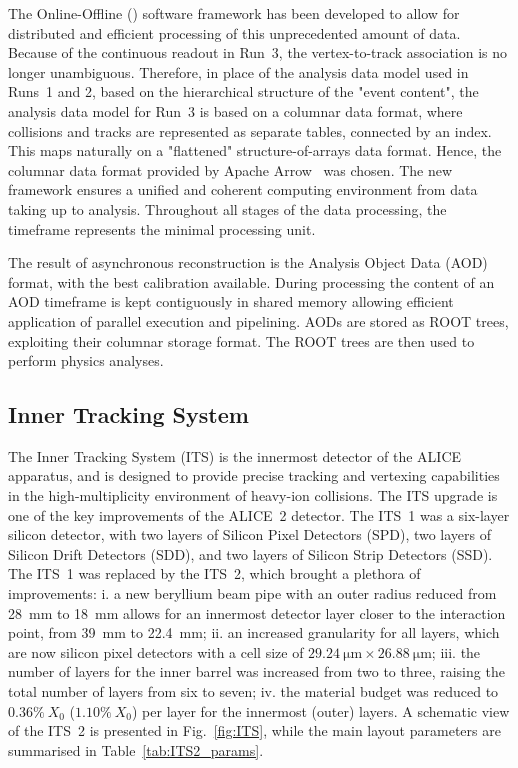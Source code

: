 The Online-Offline (\osq) software framework has been developed to allow for distributed and efficient processing of this unprecedented amount of data. Because of the continuous readout in Run~3, the vertex-to-track association is no longer unambiguous. Therefore, in place of the analysis data model used in Runs~1 and 2, based on the hierarchical structure of the "event content", the analysis data model for Run~3 is based on a columnar data format, where collisions and tracks are represented as separate tables, connected by an index. This maps naturally on a "flattened" structure-of-arrays data format. Hence, the columnar data format provided by Apache Arrow~\cite{ApacheArrow} was chosen. The new framework ensures a unified and coherent computing environment from data taking up to analysis. Throughout all stages of the data processing, the timeframe represents the minimal processing unit. 

The result of asynchronous reconstruction is the Analysis Object Data (AOD) format, with the best calibration available. During processing the content of an AOD timeframe is kept contiguously in shared memory allowing efficient application of parallel execution and pipelining. AODs are stored as ROOT trees, exploiting their columnar storage format. The ROOT trees are then used to perform physics analyses. 

\subsection{Inner Tracking System}
The Inner Tracking System (ITS) is the innermost detector of the ALICE apparatus, and is designed to provide precise tracking and vertexing capabilities in the high-multiplicity environment of heavy-ion collisions. The ITS upgrade is one of the key improvements of the ALICE~2 detector. The ITS~1 was a six-layer silicon detector, with two layers of Silicon Pixel Detectors (SPD), two layers of Silicon Drift Detectors (SDD), and two layers of Silicon Strip Detectors (SSD). The ITS~1 was replaced by the ITS~2, which brought a plethora of improvements: i. a new beryllium beam pipe with an outer radius reduced from 28~mm to 18~mm allows for an innermost detector layer closer to the interaction point, from 39~mm to 22.4~mm; ii. an increased granularity for all layers, which are now silicon pixel detectors with a cell size of $\SI{29.24}{\micro\meter}\times\SI{26.88}{\micro\meter}$; iii. the number of layers for the inner barrel was increased from two to three, raising the total number of layers from six to seven; iv. the material budget was reduced to $0.36\%~X_0$ ($1.10\%~X_0$) per layer for the innermost (outer) layers. A schematic view of the ITS~2 is presented in Fig.~\ref{fig:ITS}, while the main layout parameters are summarised in Table~\ref{tab:ITS2_params}.

